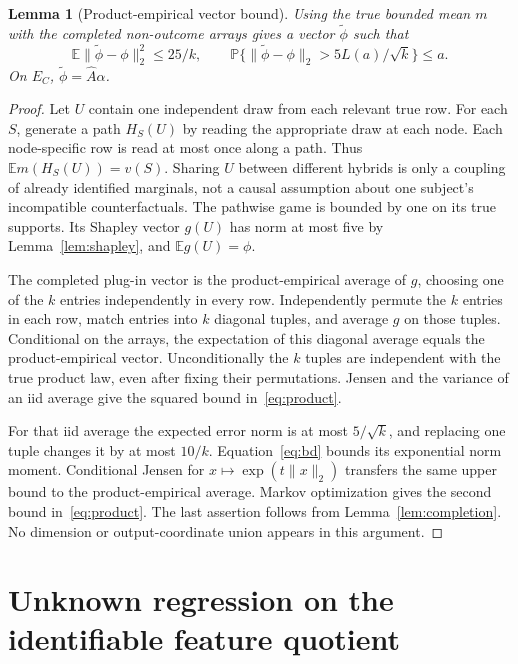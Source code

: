 \documentclass[11pt,a4paper]{article}
\numberwithin{equation}{section}
\newtheorem{lemma}[theorem]{Lemma}
\theoremstyle{definition}
\newcommand{\E}{\mathbb E}
\newcommand{\Prb}{\mathbb P}
\begin{document}
\begin{lemma}[Product-empirical vector bound]\label{lem:product}
Using the true bounded mean $m$ with the completed non-outcome arrays
gives a vector $\widetilde\phi$ such that
\begin{equation}\label{eq:product}
 \E\|\widetilde\phi-\phi\|_2^2\le25/k,\qquad
 \Prb\{\|\widetilde\phi-\phi\|_2>5L(a)/\sqrt k\}\le a.
\end{equation}
On $E_C$, $\widetilde\phi=\widehat A\alpha$.
\end{lemma}
\begin{proof}
Let $U$ contain one independent draw from each relevant true row.
For each $S$, generate a path $H_S(U)$ by reading the appropriate draw
at each node. Each node-specific row is read at most once along a path.
Thus $\E m(H_S(U))=v(S)$. Sharing $U$ between different hybrids is
only a coupling of already identified marginals, not a causal assumption
about one subject's incompatible counterfactuals. The pathwise game is
bounded by one on its true supports. Its Shapley vector $g(U)$ has norm
at most five by Lemma~\ref{lem:shapley}, and $\E g(U)=\phi$.

The completed plug-in vector is the product-empirical average of $g$,
choosing one of the $k$ entries independently in every row. Independently
permute the $k$ entries in each row, match entries into $k$ diagonal
tuples, and average $g$ on those tuples. Conditional on the arrays, the
expectation of this diagonal average equals the product-empirical vector.
Unconditionally the $k$ tuples are independent with the true product law,
even after fixing their permutations. Jensen and the variance of an
iid average give the squared bound in~\eqref{eq:product}.

For that iid average the expected error norm is at most $5/\sqrt k$,
and replacing one tuple changes it by at most $10/k$. Equation~\eqref{eq:bd}
bounds its exponential norm moment. Conditional Jensen for
$x\mapsto\exp(t\|x\|_2)$ transfers the same upper bound to the
product-empirical average. Markov optimization gives the second bound
in~\eqref{eq:product}. The last assertion follows from
Lemma~\ref{lem:completion}. No dimension or output-coordinate union
appears in this argument.
\end{proof}

\section{Unknown regression on the identifiable feature quotient}\label{sec:regression}
\end{document}
